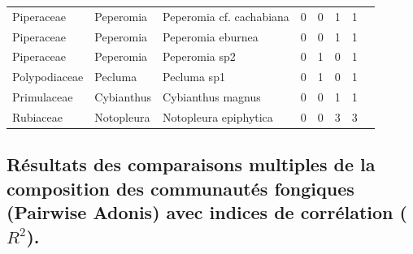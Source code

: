 \documentclass[a4paper,12pt]{article}
\begin{document}
\begin{table}[H]
\begin{tabular}{llllcccc}
        Piperaceae & Peperomia & Peperomia cf. cachabiana & 0 & 0 & 1 & 1 \\
        Piperaceae & Peperomia & Peperomia eburnea & 0 & 0 & 1 & 1 \\
        Piperaceae & Peperomia & Peperomia sp2 & 0 & 1 & 0 & 1 \\
        Polypodiaceae & Pecluma & Pecluma sp1 & 0 & 1 & 0 & 1 \\
        Primulaceae & Cybianthus & Cybianthus magnus & 0 & 0 & 1 & 1 \\
        Rubiaceae & Notopleura & Notopleura epiphytica & 0 & 0 & 3 & 3 \\
        \hline

    \end{tabular}
\end{table}

\subsection{Résultats des comparaisons multiples de la composition des communautés fongiques (Pairwise Adonis) avec indices de corrélation ($R^2$).}
\end{document}
